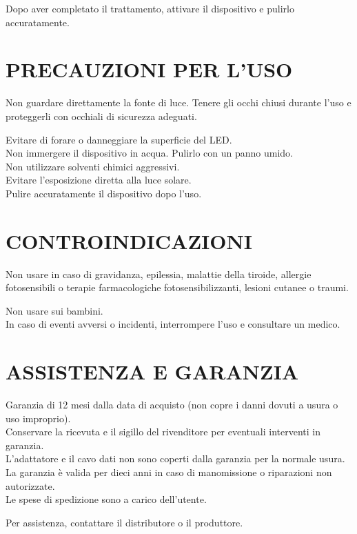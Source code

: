 \documentclass[a4paper]{article}
\begin{document}
Dopo aver completato il trattamento, attivare il dispositivo e pulirlo accuratamente.

\section{PRECAUZIONI PER L'USO}
Non guardare direttamente la fonte di luce. Tenere gli occhi chiusi durante l'uso e proteggerli con occhiali di sicurezza adeguati.

Evitare di forare o danneggiare la superficie del LED.\\
Non immergere il dispositivo in acqua. Pulirlo con un panno umido.\\
Non utilizzare solventi chimici aggressivi.\\
Evitare l'esposizione diretta alla luce solare.\\
Pulire accuratamente il dispositivo dopo l'uso.

\section{CONTROINDICAZIONI}
Non usare in caso di gravidanza, epilessia, malattie della tiroide, allergie fotosensibili o terapie farmacologiche fotosensibilizzanti, lesioni cutanee o traumi.

Non usare sui bambini.\\
In caso di eventi avversi o incidenti, interrompere l'uso e consultare un medico.

\section{ASSISTENZA E GARANZIA}
Garanzia di 12 mesi dalla data di acquisto (non copre i danni dovuti a usura o uso improprio).\\
Conservare la ricevuta e il sigillo del rivenditore per eventuali interventi in garanzia.\\
L'adattatore e il cavo dati non sono coperti dalla garanzia per la normale usura.\\
La garanzia è valida per dieci anni in caso di manomissione o riparazioni non autorizzate.\\
Le spese di spedizione sono a carico dell'utente.

Per assistenza, contattare il distributore o il produttore.
\end{document}
